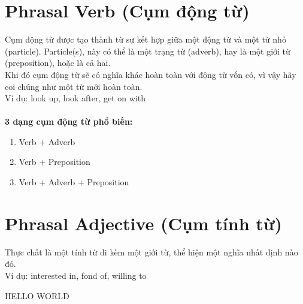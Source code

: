 \section{Phrasal Verb (Cụm động từ)}
Cụm động từ được tạo thành từ sự kết hợp giữa một động từ và một từ nhỏ (particle). Particle(s), này có thể là một trạng từ (adverb), hay là một giới từ (preposition), hoặc là cả hai. 
\\Khi đó cụm động từ sẽ có nghĩa khác hoàn toàn với động từ vốn có, vì vậy hãy coi chúng như một từ mới hoàn toàn.
\\Ví dụ: look up, look after, get on with\\\\
\textbf{3 dạng cụm động từ phổ biến:}
\begin{enumerate}
    \item Verb + Adverb
    \item Verb + Preposition
    \item Verb + Adverb + Preposition
\end{enumerate}

\section{Phrasal Adjective (Cụm tính từ)}
Thực chất là một tính từ đi kèm một giới từ, thể hiện một nghĩa nhất định nào đó.\\
Ví dụ: interested in, fond of, willing to


HELLO WORLD